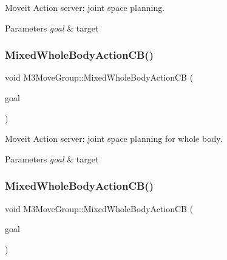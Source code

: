 Moveit Action server\+: joint space planning. 


\begin{DoxyParams}{Parameters}
{\em goal} & target \\
\hline
\end{DoxyParams}
\mbox{\label{classM3MoveGroup_a3cb5511476fb082b891ac3de867ee8b8}} 
\subsubsection{\texorpdfstring{Mixed\+Whole\+Body\+Action\+C\+B()}{MixedWholeBodyActionCB()}\hspace{0.1cm}{\footnotesize\ttfamily [1/2]}}
{\footnotesize\ttfamily void M3\+Move\+Group\+::\+Mixed\+Whole\+Body\+Action\+CB (\begin{DoxyParamCaption}\item[{const m3\+\_\+moveit\+::\+Moveit\+Whole\+Body\+Goal\+Const\+Ptr \&}]{goal }\end{DoxyParamCaption})\hspace{0.3cm}{\ttfamily [inline]}}



Moveit Action server\+: joint space planning for whole body. 


\begin{DoxyParams}{Parameters}
{\em goal} & target \\
\hline
\end{DoxyParams}
\mbox{\label{classM3MoveGroup_a3cb5511476fb082b891ac3de867ee8b8}} 
\subsubsection{\texorpdfstring{Mixed\+Whole\+Body\+Action\+C\+B()}{MixedWholeBodyActionCB()}\hspace{0.1cm}{\footnotesize\ttfamily [2/2]}}
{\footnotesize\ttfamily void M3\+Move\+Group\+::\+Mixed\+Whole\+Body\+Action\+CB (\begin{DoxyParamCaption}\item[{const m3\+\_\+moveit\+::\+Moveit\+Whole\+Body\+Goal\+Const\+Ptr \&}]{goal }\end{DoxyParamCaption})\hspace{0.3cm}{\ttfamily [inline]}}



